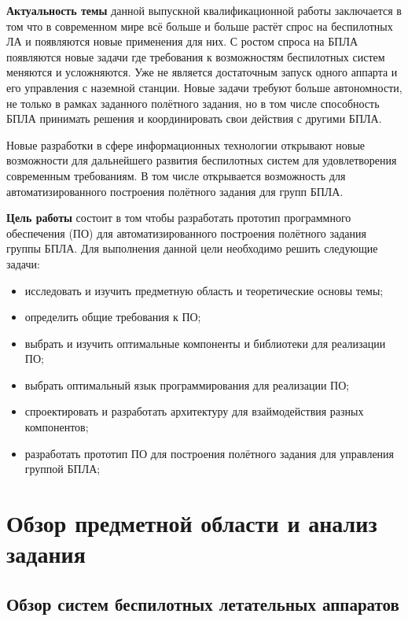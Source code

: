 \documentclass[specification,annotation]{itmo-student-thesis}
\begin{document}
\textbf{Актуальность темы} данной выпускной квалификационной работы
заключается в том что в современном мире всё больше и больше растёт спрос на
беспилотных ЛА и появляются новые применения для них. С ростом спроса на БПЛА
появляются новые задачи где требования к возможностям беспилотных систем
меняются и усложняются. Уже не является достаточным запуск одного аппарта и его
управления с наземной станции. Новые задачи требуют больше автономности, не
только в рамках заданного полётного задания, но в том числе способность БПЛА
принимать решения и координировать свои действия с другими БПЛА.

Новые разработки в сфере информационных технологии открывают новые возможности
для дальнейшего развития беспилотных систем для удовлетворения современным
требованиям. В том числе открывается возможность для автоматизированного
построения полётного задания для групп БПЛА.

\textbf{Цель работы} состоит в том чтобы разработать прототип программного
обеспечения (ПО) для автоматизированного построения полётного задания группы
БПЛА. Для выполнения данной цели необходимо решить следующие задачи:

\begin{itemize}
  \item исследовать и изучить предметную область и теоретические основы темы;
  \item определить общие требования к ПО;
  \item выбрать и изучить оптимальные компоненты и библиотеки для реализации ПО;
  \item выбрать оптимальный язык программирования для реализации ПО;
  \item спроектировать и разработать архитектуру для взаймодействия разных
    компонентов;
  \item разработать прототип ПО для построения полётного задания для управления
    группой БПЛА;
\end{itemize}

\chapter{Обзор предметной области и анализ задания}\label{ch:overview}

\section{Обзор систем беспилотных летательных аппаратов}\label{sec:sys-overview}
\end{document}
